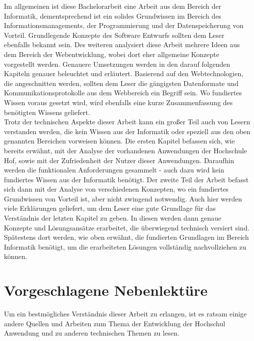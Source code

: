Im allgemeinen ist diese Bachelorarbeit eine Arbeit aus dem Bereich der Informatik, dementsprechend ist ein solides Grundwissen im Bereich des Informationsmanagements, der Programmierung und der Datenspeicherung von Vorteil. Grundlegende Konzepte des Software Entwurfs sollten dem Leser ebenfalls bekannt sein. Des weiteren analysiert diese Arbeit mehrere Ideen aus dem Bereich der Webentwicklung, wobei dort eher allgemeine Konzepte vorgestellt werden. Genauere Umsetzungen werden in den darauf folgenden Kapiteln genauer beleuchtet und erläutert. Basierend auf den Webtechnologien, die angeschnitten werden, sollten dem Leser die gängigsten Datenformate und Kommunikationsprotokolle aus dem Webbereich ein Begriff sein. Wo fundiertes Wissen voraus gesetzt wird, wird ebenfalls eine kurze Zusammenfassung des benötigten Wissens geliefert.
\\
\linebreak
Trotz der technischen Aspekte dieser Arbeit kann ein großer Teil auch von Lesern verstanden werden, die kein Wissen aus der Informatik oder speziell aus den oben genannten Bereichen vorweisen können. Die ersten Kapitel befassen sich, wie bereits erwähnt, mit der Analyse der vorhandenen Anwendungen der Hochschule Hof, sowie mit der Zufriedenheit der Nutzer dieser Anwendungen. Daraufhin werden die funktionalen Anforderungen gesammelt - auch dazu wird kein fundiertes Wissen aus der Informatik benötigt. Der zweite Teil der Arbeit befasst sich dann mit der Analyse von verschiedenen Konzepten, wo ein fundiertes Grundwissen von Vorteil ist, aber nicht zwingend notwendig. Auch hier werden viele Erklärungen geliefert, um dem Leser eine gute Grundlage für das Verständnis der letzten Kapitel zu geben. In diesen werden dann genaue Konzepte und Lösungsansätze erarbeitet, die überwiegend technisch versiert sind. Spätestens dort werden, wie oben erwähnt, die fundierten Grundlagen im Bereich Informatik benötigt, um die erarbeiteten Lösungen vollständig nachvollziehen zu können.

\section{Vorgeschlagene Nebenlektüre\label{sec:nebenlektuere}}

Um ein bestmögliches Verständnis dieser Arbeit zu erlangen, ist es ratsam einige andere Quellen und Arbeiten zum Thema der Entwicklung der Hochschul Anwendung und zu anderen technischen Themen zu lesen.

